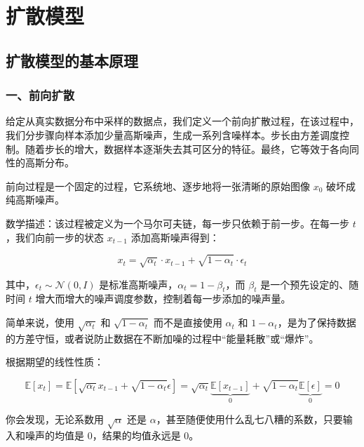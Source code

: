 \hypertarget{ux6269ux6563ux6a21ux578b}{%
\chapter{扩散模型}\label{ux6269ux6563ux6a21ux578b}}

\hypertarget{ux6269ux6563ux6a21ux578bux7684ux57faux672cux539fux7406}{%
\section{扩散模型的基本原理}\label{ux6269ux6563ux6a21ux578bux7684ux57faux672cux539fux7406}}

\hypertarget{ux4e00ux524dux5411ux6269ux6563}{%
\subsection{一、前向扩散}\label{ux4e00ux524dux5411ux6269ux6563}}

给定从真实数据分布中采样的数据点，我们定义一个前向扩散过程，在该过程中，我们分步骤向样本添加少量高斯噪声，生成一系列含噪样本。步长由方差调度控制。随着步长的增大，数据样本逐渐失去其可区分的特征。最终，它等效于各向同性的高斯分布。

前向过程是一个固定的过程，它系统地、逐步地将一张清晰的原始图像 \(x_0\) 破坏成纯高斯噪声。

数学描述：该过程被定义为一个马尔可夫链，每一步只依赖于前一步。在每一步 \(t\)，我们向前一步的状态 \(x_{t-1}\) 添加高斯噪声得到：

\[
x_t = \sqrt{\alpha_t}\cdot x_{t-1} + \sqrt{1-\alpha_t}\cdot \epsilon_t
\]

其中，\(\epsilon_t \sim \mathcal{N}(0, I)\) 是标准高斯噪声，\(\alpha_t = 1-\beta_t\)，而 \(\beta_t\) 是一个预先设定的、随时间 \(t\) 增大而增大的噪声调度参数，控制着每一步添加的噪声量。

简单来说，使用 \(\sqrt{\alpha_t}\) 和 \(\sqrt{1-\alpha_t}\) 而不是直接使用 \(\alpha_t\) 和 \(1-\alpha_t\)，是为了保持数据的方差守恒，或者说防止数据在不断加噪的过程中``能量耗散''或``爆炸''。

根据期望的线性性质：

\[
\mathbb{E}[x_t]
= \mathbb{E}\left[\sqrt{\alpha_t}x_{t-1}+\sqrt{1-\alpha_t}\epsilon\right]
= \sqrt{\alpha_t}\underbrace{\mathbb{E}[x_{t-1}]}_{0}
+ \sqrt{1-\alpha_t}\underbrace{\mathbb{E}[\epsilon]}_{0}
= 0
\]

你会发现，无论系数用 \(\sqrt{\alpha}\) 还是 \(\alpha\)，甚至随便使用什么乱七八糟的系数，只要输入和噪声的均值是 \(0\)，结果的均值永远是 \(0\)。


